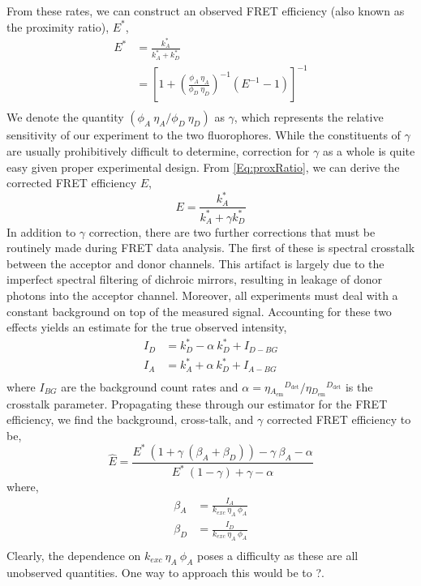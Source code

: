 \documentclass{article}
\newcommand{\emm}[1]{\ensuremath{_{#1_\mathrm{em}}}}   %
\newcommand{\dt}[1]{\ensuremath{^{#1_\mathrm{det}}}}   %
\begin{document}
From these rates, we can construct an observed FRET efficiency (also
known as the proximity ratio), $E^*$,
\begin{align*}
  E^* & = \frac{k^*_A}{k^*_A + k^*_D} \\
      & = \left[ 1 + \left(\frac{\phi_A~\eta_A}{\phi_D~\eta_D}\right)^{-1} (E^{-1} - 1) \right]^{-1} \\ \label{Eq:proxRatio}
\end{align*}
We denote the quantity $(\phi_A~\eta_A / \phi_D~\eta_D)$ as $\gamma$,
which represents the relative sensitivity of our experiment to the two
fluorophores. While the constituents of $\gamma$ are usually
prohibitively difficult to determine, correction for $\gamma$ as a
whole is quite easy given proper experimental design. From
\eqref{Eq:proxRatio}, we can derive the corrected FRET efficiency $E$,
\begin{equation}
  E = \frac{k^*_A}{k^*_A + \gamma k^*_D}
  \label{Eq:gammaFretEff}
\end{equation}
In addition to $\gamma$ correction, there are two further corrections that
must be routinely made during FRET data analysis. The first of these
is spectral crosstalk between the acceptor and donor channels. This
artifact is largely due to the imperfect spectral filtering of
dichroic mirrors, resulting in leakage of donor photons into the
acceptor channel. Moreover, all experiments must deal with a constant
background on top of the measured signal. Accounting for these two effects
yields an estimate for the true observed intensity,
\begin{align*}
  I_D & = k^*_D - \alpha~k^*_D + I_{D-BG} \\
  I_A & = k^*_A + \alpha~k^*_D + I_{A-BG} \\
\end{align*} 
where $I_{BG}$ are the background count rates and $\alpha =
\eta\emm{A}\dt{D} / \eta\emm{D}\dt{D}$ is the crosstalk
parameter. Propagating these through our estimator for the FRET
efficiency, we find the background, cross-talk, and $\gamma$ corrected
FRET efficiency to be,
\[
  \hat E = \frac{E^* ~ \left(1 + \gamma ~ (\beta_A + \beta_D)\right) - \gamma~\beta_A - \alpha}
    {E^* ~ (1 - \gamma) + \gamma - \alpha}
\]
where,
\begin{align*}
  \beta_A & = \frac{I_A}{k_{exc}~\eta_A~\phi_A} \\
  \beta_D & = \frac{I_D}{k_{exc}~\eta_A~\phi_A} \\
\end{align*}
Clearly, the dependence on $k_{exc}~\eta_A~\phi_A$ poses a difficulty
as these are all unobserved quantities. One way to approach this would
be to ?.
\end{document}
